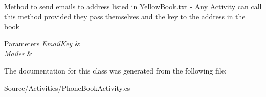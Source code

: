 Method to send emails to address listed in Yellow\+Book.\+txt -\/ Any Activity can call this method provided they pass themselves and the key to the address in the book 


\begin{DoxyParams}{Parameters}
{\em Email\+Key} & \\
\hline
{\em Mailer} & \\
\hline
\end{DoxyParams}


The documentation for this class was generated from the following file\+:\begin{DoxyCompactItemize}
\item 
Source/\+Activities/Phone\+Book\+Activity.\+cs\end{DoxyCompactItemize}
